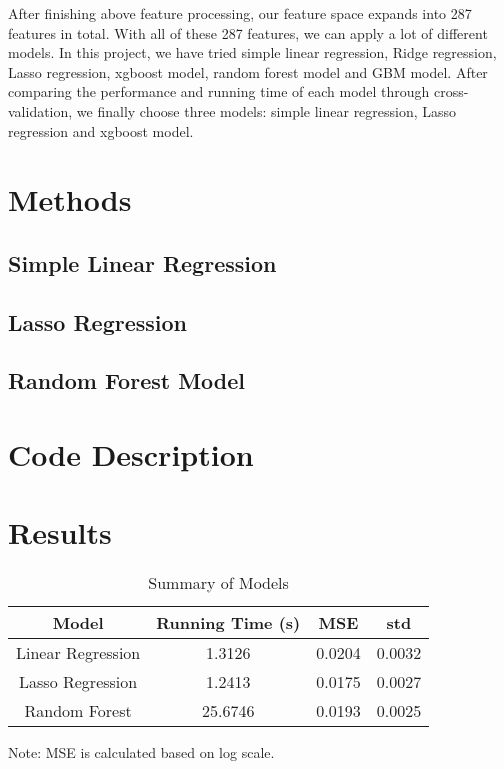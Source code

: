 \documentclass{article}
\begin{document}
After finishing above feature processing, our feature space expands into 287 features in total. With all of these 287 features, we can apply a lot of different models. In this project, we have tried simple linear regression, Ridge regression, Lasso regression, xgboost model, random forest model and GBM model. After comparing the performance and running time of each model through cross-validation, we finally choose three models: simple linear regression, Lasso regression and xgboost model.

\section{Methods}

\subsection{Simple Linear Regression}

\subsection{Lasso Regression}

\subsection{Random Forest Model}



\section{Code Description}


\section{Results}

\begin{table}[H]
 \caption{Summary of Models} \label{result}
\begin{center}
  \begin{tabular}{  c  c c  c }
    \hline
    Model                             & Running Time (s)              & MSE     & std \\ \hline
    Linear Regression           & 1.3126                               & 0.0204      & 0.0032 \\
    Lasso Regression                & 1.2413                          & 0.0175    & 0.0027 \\
    Random Forest                  & 25.6746                          & 0.0193          & 0.0025 \\

    \hline
  \end{tabular}
\end{center}
\end{table}
Note: MSE is calculated based on log scale.
\end{document}
